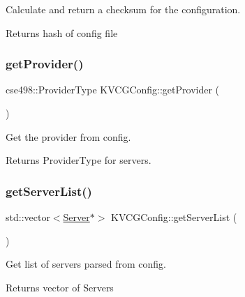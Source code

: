 Calculate and return a checksum for the configuration.

\begin{DoxyReturn}{Returns}
hash of config file 
\end{DoxyReturn}
\mbox{\label{classKVCGConfig_a66862a874ddbbe54e7b696894b970539}} 
\subsubsection{\texorpdfstring{get\+Provider()}{getProvider()}}
{\footnotesize\ttfamily cse498\+::\+Provider\+Type K\+V\+C\+G\+Config\+::get\+Provider (\begin{DoxyParamCaption}{ }\end{DoxyParamCaption})\hspace{0.3cm}{\ttfamily [inline]}}

Get the provider from config.

\begin{DoxyReturn}{Returns}
Provider\+Type for servers. 
\end{DoxyReturn}
\mbox{\label{classKVCGConfig_a61fb9cd072f12acd361c7bed3936bd4b}} 
\subsubsection{\texorpdfstring{get\+Server\+List()}{getServerList()}}
{\footnotesize\ttfamily std\+::vector$<$\mbox{\hyperlink{classServer}{Server}}$\ast$$>$ K\+V\+C\+G\+Config\+::get\+Server\+List (\begin{DoxyParamCaption}{ }\end{DoxyParamCaption})\hspace{0.3cm}{\ttfamily [inline]}}

Get list of servers parsed from config.

\begin{DoxyReturn}{Returns}
vector of Servers 
\end{DoxyReturn}
\mbox{\label{classKVCGConfig_a47206f279489aacccb9200f0bf9b36cf}} 
